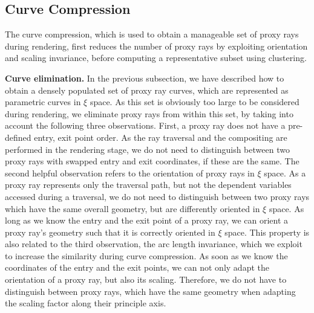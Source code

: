 \documentclass[journal]{vgtc}                %
\begin{document}
\subsection{Curve Compression}\label{subsec:curvecompression}

The curve compression, which is used to obtain a manageable set of proxy rays during rendering, first reduces the number of proxy rays by exploiting orientation and scaling invariance, before computing a representative subset using clustering.

\noindent \textbf{Curve elimination.} In the previous subsection, we have described how to obtain a densely populated set of proxy ray curves, which are represented as parametric curves in $\xi$ space. As this set is obviously too large to be considered during rendering, we eliminate proxy rays from within this set, by taking into account the following three observations. First, a proxy ray does not have a pre-defined entry, exit point order. As the ray traversal and the compositing are performed in the rendering stage, we do not need to distinguish between two proxy rays with swapped entry and exit coordinates, if these are the same. The second helpful observation refers to the orientation of proxy rays in $\xi$ space. As a proxy ray represents only the traversal path, but not the dependent variables accessed during a traversal, we do not need to distinguish between two proxy rays which have the same overall geometry, but are differently oriented in $\xi$ space. As long as we know the entry and the exit point of a proxy ray, we can orient a proxy ray's geometry such that it is correctly oriented in $\xi$ space. This property is also related to the third observation, the arc length invariance, which we exploit to increase the similarity during curve compression. As soon as we know the coordinates of the entry and the exit points, we can not only adapt the orientation of a proxy ray, but also its scaling. Therefore, we do not have to distinguish between proxy rays, which have the same geometry when adapting the scaling factor along their principle axis.
\end{document}
